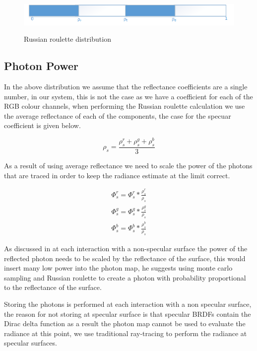 \begin{figure}
\includegraphics{./images/russian_roulette_distribution.png}
\label{fig:rr_dist}
\caption{Russian roulette distribution}
\end{figure}

\subsection{Photon Power}
In the above distribution we assume that the reflectance coefficients are a single number, in our system, this is not
the case as we have a coefficient for each of the RGB colour channels, when performing the Russian roulette calculation
we use the average reflectance of each of the components, the case for the specuar coefficient is given below.

\begin{equation}
\rho_s = \frac{\rho_s^r + \rho_s^g + \rho_s^b}{3}
\end{equation}

As a result of using average reflectance we need to scale the power of the photons that are traced in order to keep the
radiance estimate at the limit correct.

\begin{equation}
\begin{array}{lcr} \Phi_s^r = \Phi_s^r * \frac{\rho_s^r}{\rho_{s}}\\ \Phi_s^g = \Phi_s^g * \frac{\rho_s^g}{\rho_{s}}\\ \Phi_s^b = \Phi_s^b * \frac{\rho_s^b}{\rho_{s}}
\end{array}
\end{equation}

As discussed in  at each interaction with a non-specular surface the power of the reflected photon
needs to be scaled by the reflectance of the surface, this would insert many low power into the photon map, he suggests
using monte carlo sampling and Russian roulette to create a photon with probability proportional to the reflectance
of the surface.

Storing the photons is performed at each interaction with a non specular surface, the reason for not storing at specular
surface is that specular BRDFs contain the Dirac delta function as a result the photon map cannot be used to evaluate the
radiance at this point, we use traditional ray-tracing to perform the radiance at specular surfaces.


